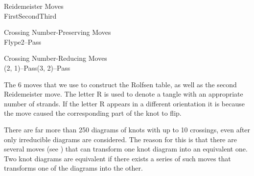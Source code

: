 \begin{paper}
\begin{center}\begin{minipage}{\columnwidth}\begin{center}
Reidemeister Moves\vspace{0.5em}
\\\vspace{0.5em}
First\hspace{0.19\columnwidth}Second\hspace{0.17\columnwidth}Third\\\vspace{1em}
\end{center}\end{minipage}\end{center}
\begin{center}\begin{minipage}{\columnwidth}\begin{center}
Crossing Number-Preserving Moves\vspace{0.5em}
\\\vspace{0.5em}
Flype\hspace{0.3\columnwidth}2--Pass\\\vspace{1em}
\end{center}\end{minipage}\end{center}
\begin{center}\begin{minipage}{\columnwidth}\begin{center}
Crossing Number-Reducing Moves\vspace{0.5em}
\\\vspace{0.5em}
(2, 1)--Pass\hspace{0.2\columnwidth}(3, 2)--Pass
\end{center}\end{minipage}\end{center}

{The 6 moves that we use to construct the Rolfsen table, as well as the second
Reidemeister move.
The letter R is used to denote a tangle with an appropriate number of strands.
If the letter R appears in a different orientation it is because the move caused
the corresponding part of the knot to flip.}

There are far more than 250 diagrams of knots with up to 10 crossings, even
after only irreducible diagrams are considered.
The reason for this is that there are several moves (see \figMoves) that can
transform one knot diagram into an equivalent one.
Two knot diagrams are equivalent if there exists a series of such moves that
transforms one of the diagrams into the other.\\


\end{paper}
